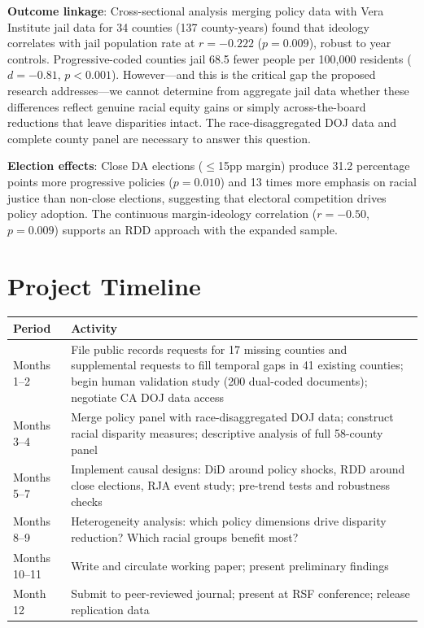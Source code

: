 \documentclass[12pt]{article}
\begin{document}
\textbf{Outcome linkage}: Cross-sectional analysis merging policy data with Vera Institute jail data for 34 counties (137 county-years) found that ideology correlates with jail population rate at $r = -0.222$ ($p = 0.009$), robust to year controls. Progressive-coded counties jail 68.5 fewer people per 100,000 residents ($d = -0.81$, $p < 0.001$). However---and this is the critical gap the proposed research addresses---we cannot determine from aggregate jail data whether these differences reflect genuine racial equity gains or simply across-the-board reductions that leave disparities intact. The race-disaggregated DOJ data and complete county panel are necessary to answer this question.

\textbf{Election effects}: Close DA elections ($\leq$15pp margin) produce 31.2 percentage points more progressive policies ($p = 0.010$) and 13 times more emphasis on racial justice than non-close elections, suggesting that electoral competition drives policy adoption. The continuous margin-ideology correlation ($r = -0.50$, $p = 0.009$) supports an RDD approach with the expanded sample.

\section{Project Timeline}

\begin{table}[h]
\centering
\small
\begin{tabular}{lp{11cm}}
\toprule
\textbf{Period} & \textbf{Activity} \\
\midrule
Months 1--2 & File public records requests for 17 missing counties and supplemental requests to fill temporal gaps in 41 existing counties; begin human validation study (200 dual-coded documents); negotiate CA DOJ data access \\
Months 3--4 & Merge policy panel with race-disaggregated DOJ data; construct racial disparity measures; descriptive analysis of full 58-county panel \\
Months 5--7 & Implement causal designs: DiD around policy shocks, RDD around close elections, RJA event study; pre-trend tests and robustness checks \\
Months 8--9 & Heterogeneity analysis: which policy dimensions drive disparity reduction? Which racial groups benefit most? \\
Months 10--11 & Write and circulate working paper; present preliminary findings \\
Month 12 & Submit to peer-reviewed journal; present at RSF conference; release replication data \\
\bottomrule
\end{tabular}
\end{table}
\end{document}
